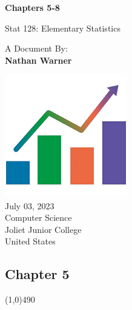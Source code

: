 \documentclass{report}
\title{\Huge{}}
\author{\huge{Nathan Warner}}
\date{\huge{}}
\begin{document}
        \begin{titlepage}
       \begin{center}
           \vspace*{1cm}
    
           \textbf{Chapters 5-8}
    
           \vspace{0.5cm}
           Stat 128: Elementary Statistics
            
                
           \vspace{1.5cm}
   
           A Document By: \\
           \textbf{Nathan Warner}
    
           \vfill
                
                
           \vspace{0.8cm}
         
           \includegraphics[width=0.4\textwidth]{../1-4/figures/2.png} \\
            July 03, 2023  \\
           Computer Science \\
           Joliet Junior College \\
           United States\\
           
                
       \end{center}
    \end{titlepage}
    \tableofcontents
    \pagebreak \bigbreak \noindent
    \begin{center}
        \section*{Chapter 5}
    \end{center}
    \line(1,0){490}
    \bigbreak \noindent 
\end{document}
